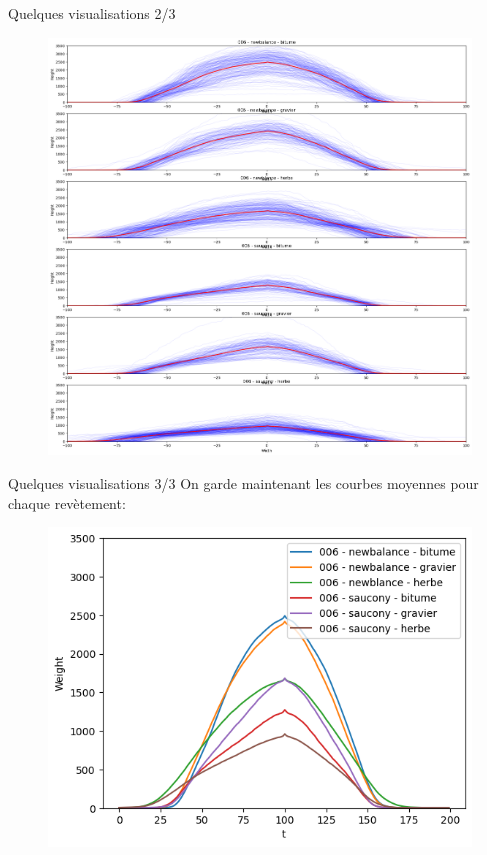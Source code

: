 \begin{frame}{Quelques visualisations 2/3}
    \begin{figure}
        \includegraphics[scale=0.2]{./figures/res_03.png}
    \end{figure}
\end{frame}
\begin{frame}{Quelques visualisations 3/3}
    On garde maintenant les courbes moyennes pour chaque revètement:
    \begin{figure}
        \includegraphics[scale=0.5]{./figures/res_04.png}
    \end{figure}
\end{frame}
